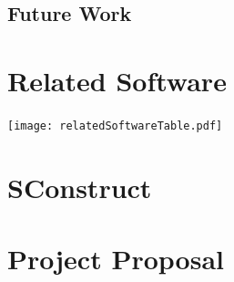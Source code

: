 \documentclass[12pt,a4paper,twoside,openright]{report}
\begin{document}
\section{Future Work}



\appendix
\chapter{Related Software}

\texttt{[image: relatedSoftwareTable.pdf]}


\chapter{SConstruct}


\chapter{Project Proposal}

\end{document}
